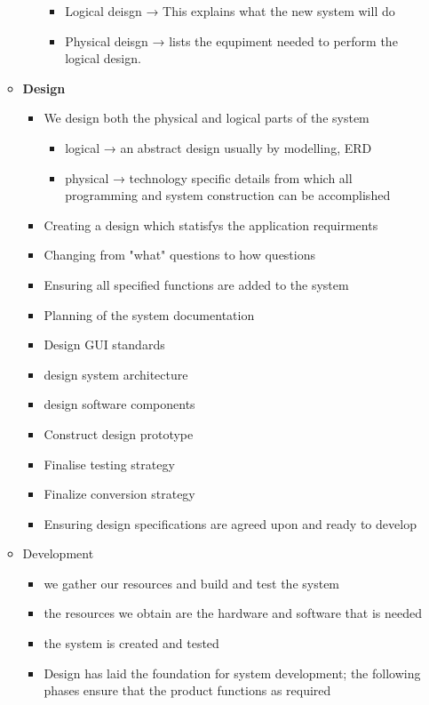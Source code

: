 \documentclass[12pt, a4, twoside]{article}
\begin{document}
\begin{itemize}
\begin{itemize}
\begin{itemize}
\begin{itemize}
          \item Logical deisgn → This explains what the new system will do
          \item Physical deisgn → lists the equpiment needed to perform the logical design.
        \end{itemize}
      \end{itemize}
      \item \textbf{Design}
      \begin{itemize}
        \item We design both the physical and logical parts of the system
        \begin{itemize}
          \item logical → an abstract design usually by modelling, ERD
          \item physical → technology specific details from which all programming and system construction can be accomplished
        \end{itemize}
        \item Creating a design which statisfys the application requirments
        \item Changing from "what" questions to how questions
        \item Ensuring all specified functions are added to the system
        \item Planning of the system documentation
        \item Design GUI standards
        \item design system architecture
        \item design software components
        \item Construct design prototype
        \item Finalise testing strategy
        \item Finalize conversion strategy
        \item Ensuring design specifications are agreed upon and ready to develop
      \end{itemize}
      \item Development
      \begin{itemize}
        \item we gather our resources and build and test the system
        \item the resources we obtain are the hardware and software that is needed
        \item the system is created and tested
        \item Design has laid the foundation for system development; the following phases ensure that the product functions as required

\end{itemize}
\end{itemize}
\end{itemize}
\end{document}
